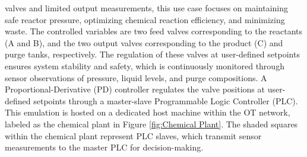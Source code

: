       valves and limited output measurements, this use case focuses on maintaining safe reactor pressure, optimizing chemical reaction efficiency, and minimizing waste. The controlled variables are two feed valves corresponding to the reactants (A and B), and the two output valves corresponding to the product (C) and purge tanks, respectively. The regulation of these valves at user-defined setpoints ensures system stability and safety, which is continuously monitored through sensor observations of pressure, liquid levels, and purge compositions. A Proportional-Derivative (PD) controller regulates the valve positions at user-defined setpoints through a master-slave Programmable Logic Controller (PLC).
    This emulation is hosted on a dedicated host machine within the OT network, labeled as the chemical plant in Figure \ref{fig:Chemical Plant}. The shaded squares within the chemical plant represent PLC slaves, which transmit sensor measurements to the master PLC for decision-making.

